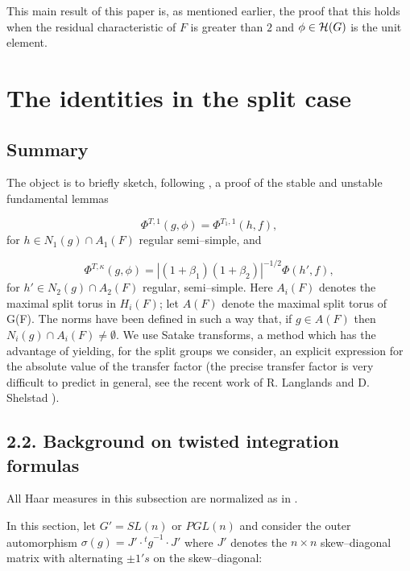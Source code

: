 \documentclass[12pt,letterpaper]{article}
\def\hhh{{\cal H}}
\begin{document}
This main result of this paper is, as mentioned earlier, the proof that
this holds when the residual characteristic of $F$ is greater than $2$ and
$\phi \in \hhh (G)$ is the unit element. 







\section{The identities in the split case}
\label{sec:2}

\subsection{Summary}

The object is to briefly sketch, following \cite{La1}, a proof of the stable
and unstable fundamental lemmas

\begin{equation}
\label{eqn:2.1}
\Phi^{T,1}(g,\phi ) = \Phi^{T_1,1}(h,f),
\end{equation}
for $h\in N_1(g)\cap A_1(F)$ regular semi--simple, and

\begin{equation}
\label{eqn:2.2}
\Phi^{T,\kappa}(g,\phi ) = |(1+\beta_1)(1+\beta_2)|^{-1/2}\Phi(h',f),
\end{equation}
for $h'\in N_2(g)\cap A_2(F)$ regular, semi--simple. Here $A_i(F)$ denotes
the maximal split torus in $H_i(F)$; let $A(F)$ denote the maximal split torus
of G(F). The norms have been defined in such a way that, if $g\in A(F)$
then $N_i(g)\cap A_i(F) \not= \emptyset$. We use Satake transforms,
a method which has the advantage of yielding, for the split groups
we consider, an explicit expression for the absolute value of the
transfer factor (the precise transfer factor is very difficult to predict in
general, see the recent work of R. Langlands and D. Shelstad \cite{LS}).

\subsection{2.2. Background on twisted integration formulas}
\label{sec:2.2}

All Haar measures in this subsection are normalized as in \cite{C}.
\par
In this section, let $G' =SL(n)$ or $PGL(n)$ 
and consider the outer automorphism
$\sigma (g) = J'\cdot {^{t}g}^{-1}\cdot J'$ where $J'$ denotes the $n\times n$
skew--diagonal matrix with alternating $\pm 1's$ on the skew--diagonal:
\end{document}
